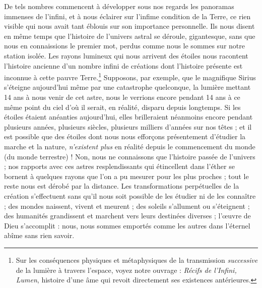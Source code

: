 \documentclass[a4paper, 11pt, oneside, landscape]{article}
\begin{document}
De tels nombres commencent à développer sous nos regards les panoramas immenses de l'infini, et à nous éclairer sur l'infime condition de la Terre, ce rien visible qui nous avait tant éblouis sur son importance personnelle. Ils nous disent en même temps que l'histoire de l'univers astral se déroule, gigantesque, sans que nous en connaissions le premier mot, perdus comme nous le sommes sur notre station isolée. Les rayons lumineux qui nous arrivent des étoiles nous racontent l'histoire ancienne d'un nombre infini de créations dont l'histoire présente est inconnue à cette pauvre Terre.\footnote{Sur les conséquences physiques et métaphysiques de la transmission \emph{successive} de la lumière à travers l'espace, voyez notre ouvrage : \emph{Récifs de l'Infini, Lumen}, histoire d'une âme qui revoit directement ses existences antérieures.} Supposons, par exemple, que le magnifique Sirius s'éteigne aujourd'hui même par une catastrophe quelconque, la lumière mettant 14 ans à nous venir de cet astre, nous le verrions encore pendant 14 ans à ce même point du ciel d'où il serait, en réalité, disparu depuis longtemps. Si les étoiles étaient anéanties aujourd'hui, elles brilleraient néanmoins encore pendant plusieurs années, plusieurs siècles, plusieurs milliers d'années sur nos têtes ; et il est possible que des étoiles dont nous nous efforçons présentement d'étudier la marche et la nature, \emph{n'existent plus} en réalité depuis le commencement du monde (du monde terrestre) ! Non, nous ne connaissons que l'histoire passée de l'univers ; nos rapports avec ces astres resplendissants qui étincellent dans l'éther se bornent à quelques rayons que l'on a pu mesurer pour les plus proches ; tout le reste nous est dérobé par la distance. Les transformations perpétuelles de la création s'effectuent sans qu'il nous soit possible de les étudier ni de les connaître ; des mondes naissent, vivent et meurent ; des soleils s'allument ou s'éteignent ; des humanités grandissent et marchent vers leurs destinées diverses ; l'œuvre de Dieu s'accomplit : nous, nous sommes emportés comme les autres dans l'éternel abîme sans rien savoir.
\end{document}
